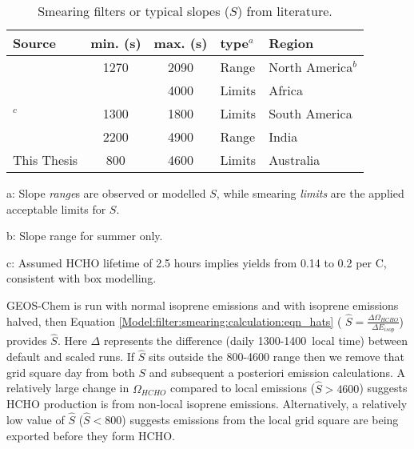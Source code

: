 {      \begin{table}\begin{threeparttable}
        \caption{Smearing filters or typical slopes ($S$) from literature.}
        \begin{tabular}{ l | c  c  l  >{\centering\arraybackslash}p{3cm} } 
          \toprule
          Source & min. (s) & max. (s) & type$^a$ & Region \\
          \midrule
          \textcite{Palmer2003}      & 1270 & 2090 & Range & North America$^{b}$ \\
          \textcite{Marais2012}      &      & 4000 & Limits & Africa \\
          \textcite{Barkley2013}$^c$ & 1300 & 1800 & Limits & South America \\
          \textcite{Surl2018}        & 2200 & 4900 & Range & India \\
          This Thesis             & 800  & 4600 & Limits & Australia \\
          \bottomrule
        \end{tabular}
        \begin{tablenotes} 
          \item a: Slope \textit{range}s are observed or modelled $S$, while smearing \textit{limits} are the applied acceptable limits for $S$. 
          \item b: Slope range for summer only.
          \item c: Assumed HCHO lifetime of 2.5 hours implies yields from 0.14 to 0.2 per C, consistent with box modelling.
        \end{tablenotes}
        \label{Model:filter:smearing:tab_smearing_ranges}
      \end{threeparttable}\end{table}
      
      
      
      GEOS-Chem is run with normal isoprene emissions and with isoprene emissions halved, then Equation \ref{Model:filter:smearing:calculation:eqn_hats} ( $\hat{S} = \frac{\Delta \Omega_{HCHO}}{\Delta E_{isop}} $) provides $\hat{S}$.
      Here $\Delta$ represents the difference (daily 1300-1400~local time) between default and scaled runs.
      If $\hat{S}$ sits outside the 800-4600 range then we remove that grid square day from both $S$ and subsequent a posteriori emission calculations.
      A relatively large change in $\Omega_{HCHO}$ compared to local emissions ($\hat{S}>4600$) suggests HCHO production is from non-local isoprene emissions.
      Alternatively, a relatively low value of $\hat{S}$ ($\hat{S}<800$) suggests emissions from the local grid square are being exported before they form HCHO.
      
}
